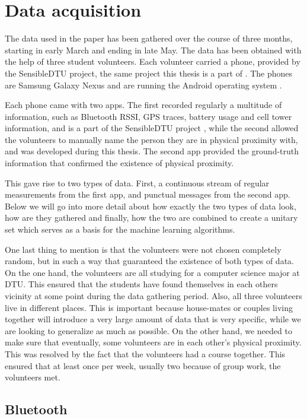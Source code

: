 \chapter{Data acquisition}

The data used in the paper has been gathered over the course of three months, starting in early March and ending in late May. The data has been obtained with the help of three student volunteers. Each volunteer carried a phone, provided by the SensibleDTU project, the same project this thesis is a part of \cite{sensibledtu, Stopczynski}. The phones are Samsung Galaxy Nexus \cite{nexus} and are running the Android operating system \cite{android}.

Each phone came with two apps. The first recorded regularly a multitude of information, such as Bluetooth RSSI, GPS traces, battery usage and cell tower information, and is a part of the SensibleDTU project \cite{Stopczynski}, while the second allowed the volunteers to manually name the person they are in physical proximity with, and was developed during this thesis. The second app provided the ground-truth information that confirmed the existence of physical proximity.

This gave rise to two types of data. First, a continuous stream of regular measurements from the first app, and punctual messages from the second app. Below we will go into more detail about how exactly the two types of data look, how are they gathered and finally, how the two are combined to create a unitary set which serves as a basis for the machine learning algorithms.

One last thing to mention is that the volunteers were not chosen completely random, but in such a way that guaranteed the existence of both types of data. On the one hand, the volunteers are all studying for a computer science major at DTU. This ensured that the students have found themselves in each others vicinity at some point during the data gathering period. Also, all three volunteers live in different places. This is important because house-mates or couples living together will introduce a very large amount of data that is very specific, while we are looking to generalize as much as possible.
On the other hand, we needed to make sure that eventually, some volunteers are in each other's physical proximity. This was resolved by the fact that the volunteers had a course together. This ensured that at least once per week, usually two because of group work, the volunteers met.

\section{Bluetooth}

